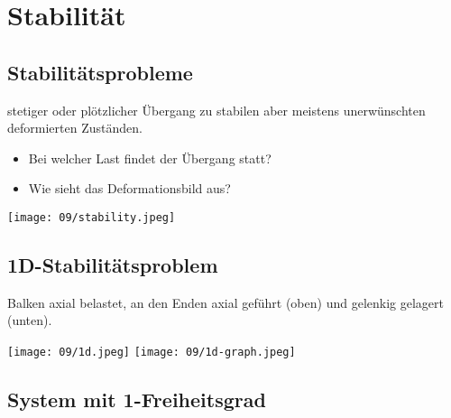 \section{Stabilität}
    \subsection{Stabilitätsprobleme}
        stetiger oder plötzlicher Übergang zu stabilen aber meistens unerwünschten deformierten Zuständen.
        \begin{itemize}
            \item Bei welcher Last findet der Übergang statt?
            \item Wie sieht das Deformationsbild aus?
        \end{itemize}
        \begin{center}
            \texttt{[image: 09/stability.jpeg]}
        \end{center}
    \subsection{1D-Stabilitätsproblem}
        Balken axial belastet, an den Enden axial geführt (oben) und gelenkig gelagert (unten).
        \begin{center}
            \texttt{[image: 09/1d.jpeg]}
            \texttt{[image: 09/1d-graph.jpeg]}
        \end{center}
    \subsection{System mit 1-Freiheitsgrad}
        \TODO{}